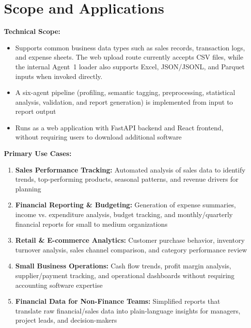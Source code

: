 \documentclass[12pt,a4paper,openany]{report}
\begin{document}
\section{Scope and Applications}

\hspace*{\parindent}\textbf{Technical Scope:}

\begin{itemize}
	\item Supports common business data types such as sales records, transaction logs, and expense sheets. The web upload route currently accepts CSV files, while the internal Agent~1 loader also supports Excel, JSON/JSONL, and Parquet inputs when invoked directly.
	\item A six-agent pipeline (profiling, semantic tagging, preprocessing, statistical analysis, validation, and report generation) is implemented from input to report output
	\item Runs as a web application with FastAPI backend and React frontend, without requiring users to download additional software
\end{itemize}

\textbf{Primary Use Cases:}

\begin{enumerate}
	\item \textbf{Sales Performance Tracking:} Automated analysis of sales data to identify trends, top-performing products, seasonal patterns, and revenue drivers for planning

	\item \textbf{Financial Reporting \& Budgeting:} Generation of expense summaries, income vs. expenditure analysis, budget tracking, and monthly/quarterly financial reports for small to medium organizations

	\item \textbf{Retail \& E-commerce Analytics:} Customer purchase behavior, inventory turnover analysis, sales channel comparison, and category performance review

	\item \textbf{Small Business Operations:} Cash flow trends, profit margin analysis, supplier/payment tracking, and operational dashboards without requiring accounting software expertise

	\item \textbf{Financial Data for Non-Finance Teams:} Simplified reports that translate raw financial/sales data into plain-language insights for managers, project leads, and decision-makers
\end{enumerate}
\end{document}

